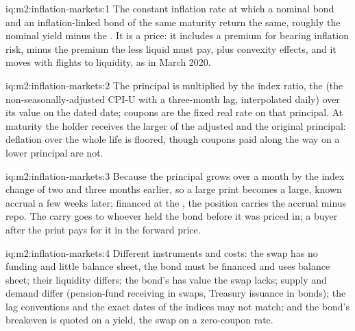 \begin{solution}{iq:m2:inflation-markets:1}
The constant inflation rate at which a nominal bond and an inflation-linked
bond of the same maturity return the same, roughly the nominal yield minus the
. It is a price: it includes a premium for bearing inflation risk,
minus the premium the less liquid  must pay, plus convexity effects, and it
moves with flights to liquidity, as in March 2020.
\end{solution}

\begin{solution}{iq:m2:inflation-markets:2}
The principal is multiplied by the index ratio, the  (the
non-seasonally-adjusted CPI-U with a three-month lag, interpolated daily) over
its value on the dated date; coupons are the fixed real rate on that principal.
At maturity the holder receives the larger of the adjusted and the original
principal: deflation over the whole life is floored, though coupons paid
along the way on a lower principal are not.
\end{solution}

\begin{solution}{iq:m2:inflation-markets:3}
Because the principal grows over a month by the index change of two and three
months earlier, so a large print becomes a large, known accrual a few weeks
later; financed at the , the position carries the accrual minus
repo. The carry goes to whoever held the bond before it was priced in; a buyer
after the print pays for it in the forward price.
\end{solution}

\begin{solution}{iq:m2:inflation-markets:4}
Different instruments and costs: the swap has no funding and little balance
sheet, the bond must be financed and uses balance sheet; their liquidity
differs; the bond's  has value the swap lacks; supply and demand
differ (pension-fund receiving in swaps, Treasury issuance in bonds); the
lag conventions and the exact dates of the indices may not match; and the
bond's breakeven is quoted on a yield, the swap on a zero-coupon rate.
\end{solution}

